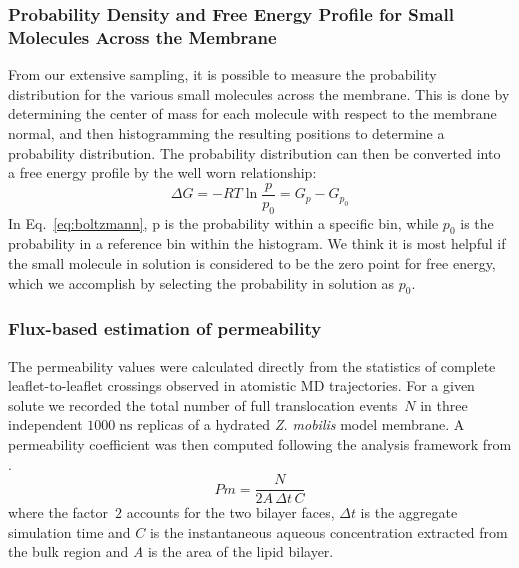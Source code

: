 \subsubsection*{Probability Density and Free Energy Profile for Small Molecules Across the Membrane}
From our extensive sampling, it is possible to measure the probability distribution for the various small molecules across the membrane.
This is done by determining the center of mass for each molecule with respect to the membrane normal, and then histogramming the resulting positions to determine a probability distribution.
The probability distribution can then be converted into a free energy profile by the well worn relationship:
\begin{equation}
	\label{eq:boltzmann}
	\Delta G = -RT \ln \frac{p}{p_0} = G_p - G_{p_0}
\end{equation}
In Eq.~\ref{eq:boltzmann}, p is the probability within a specific bin, while $p_0$ is the probability in a reference bin within the histogram.
We think it is most helpful if the small molecule in solution is considered to be the zero point for free energy, which we accomplish by selecting the probability in solution as $p_0$.


\subsubsection{Flux-based estimation of permeability}

The permeability values were calculated
directly from the statistics of complete leaflet-to-leaflet crossings observed
in atomistic MD trajectories.
For a given solute we recorded the total number
of full translocation events~$N$ in three independent $1000\;\text{ns}$
replicas of a hydrated \emph{Z. mobilis} model membrane.  
A permeability coefficient was then
computed following the analysis framework from \citet{Venable2019}.
%
\begin{equation}
	Pm = \frac{N}{2 A \, \Delta t \, C}
	\label{eq:permeability}
\end{equation}
%
where the factor~$2$ accounts for the two bilayer faces, $\Delta t$ is the
aggregate simulation time and $C$ is the instantaneous aqueous concentration
extracted from the bulk region and \emph{A} is the area of the lipid bilayer.